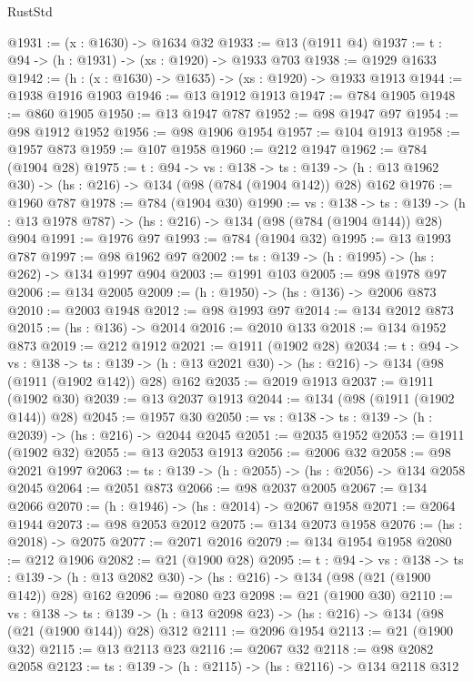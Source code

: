 \begin{lexlean}{RustStd}
\begin{coremodule}
@1931 := (x : @1630) -> @1634 @32
@1933 := @13 (@1911 @4)
@1937 := {t : @94} -> (h : @1931) -> (xs : @1920) -> @1933 @703
@1938 := @1929 @1633
@1942 := (h : (x : @1630) -> @1635) -> (xs : @1920) -> @1933 @1913
@1944 := @1938 @1916 @1903
@1946 := @13 @1912 @1913
@1947 := @784 @1905
@1948 := @860 @1905
@1950 := @13 @1947 @787
@1952 := @98 @1947 @97
@1954 := @98 @1912 @1952
@1956 := @98 @1906 @1954
@1957 := @104 @1913
@1958 := @1957 @873
@1959 := @107 @1958
@1960 := @212 @1947
@1962 := @784 (@1904 @28)
@1975 := {t : @94} ->
  {vs : @138} ->
  {ts : @139} -> (h : @13 @1962 @30) -> (hs : @216) -> @134 (@98 (@784 (@1904 @142)) @28) @162
@1976 := @1960 @787
@1978 := @784 (@1904 @30)
@1990 := {vs : @138} ->
  {ts : @139} -> (h : @13 @1978 @787) -> (hs : @216) -> @134 (@98 (@784 (@1904 @144)) @28) @904
@1991 := @1976 @97
@1993 := @784 (@1904 @32)
@1995 := @13 @1993 @787
@1997 := @98 @1962 @97
@2002 := {ts : @139} -> (h : @1995) -> (hs : @262) -> @134 @1997 @904
@2003 := @1991 @103
@2005 := @98 @1978 @97
@2006 := @134 @2005
@2009 := (h : @1950) -> (hs : @136) -> @2006 @873
@2010 := @2003 @1948
@2012 := @98 @1993 @97
@2014 := @134 @2012 @873
@2015 := (hs : @136) -> @2014
@2016 := @2010 @133
@2018 := @134 @1952 @873
@2019 := @212 @1912
@2021 := @1911 (@1902 @28)
@2034 := {t : @94} ->
  {vs : @138} ->
  {ts : @139} -> (h : @13 @2021 @30) -> (hs : @216) -> @134 (@98 (@1911 (@1902 @142)) @28) @162
@2035 := @2019 @1913
@2037 := @1911 (@1902 @30)
@2039 := @13 @2037 @1913
@2044 := @134 (@98 (@1911 (@1902 @144)) @28)
@2045 := @1957 @30
@2050 := {vs : @138} -> {ts : @139} -> (h : @2039) -> (hs : @216) -> @2044 @2045
@2051 := @2035 @1952
@2053 := @1911 (@1902 @32)
@2055 := @13 @2053 @1913
@2056 := @2006 @32
@2058 := @98 @2021 @1997
@2063 := {ts : @139} -> (h : @2055) -> (hs : @2056) -> @134 @2058 @2045
@2064 := @2051 @873
@2066 := @98 @2037 @2005
@2067 := @134 @2066
@2070 := (h : @1946) -> (hs : @2014) -> @2067 @1958
@2071 := @2064 @1944
@2073 := @98 @2053 @2012
@2075 := @134 @2073 @1958
@2076 := (hs : @2018) -> @2075
@2077 := @2071 @2016
@2079 := @134 @1954 @1958
@2080 := @212 @1906
@2082 := @21 (@1900 @28)
@2095 := {t : @94} ->
  {vs : @138} ->
  {ts : @139} -> (h : @13 @2082 @30) -> (hs : @216) -> @134 (@98 (@21 (@1900 @142)) @28) @162
@2096 := @2080 @23
@2098 := @21 (@1900 @30)
@2110 := {vs : @138} ->
  {ts : @139} -> (h : @13 @2098 @23) -> (hs : @216) -> @134 (@98 (@21 (@1900 @144)) @28) @312
@2111 := @2096 @1954
@2113 := @21 (@1900 @32)
@2115 := @13 @2113 @23
@2116 := @2067 @32
@2118 := @98 @2082 @2058
@2123 := {ts : @139} -> (h : @2115) -> (hs : @2116) -> @134 @2118 @312

\end{coremodule}
\end{lexlean}

